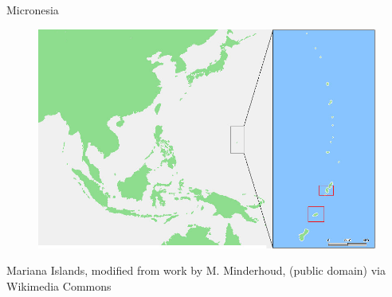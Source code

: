 \documentclass{beamer}
\begin{document}
\begin{frame}{Micronesia}
	\begin{figure}
		\centering
		\includegraphics[height=.80\textheight]{../images/islands.jpg}
	\end{figure}
	\tiny
	\begin{center}\color{OSUdkbrn}
	Mariana Islands, modified from work by M. Minderhoud, (public domain) via  Wikimedia Commons
	\end{center}

\end{frame}
\end{document}
